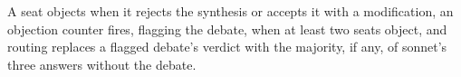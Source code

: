 A seat objects when it rejects the synthesis or accepts it with a
modification, an objection counter fires, flagging the debate, when at
least two seats object, and routing replaces a flagged debate's verdict
with the majority, if any, of sonnet's three answers without the debate.
